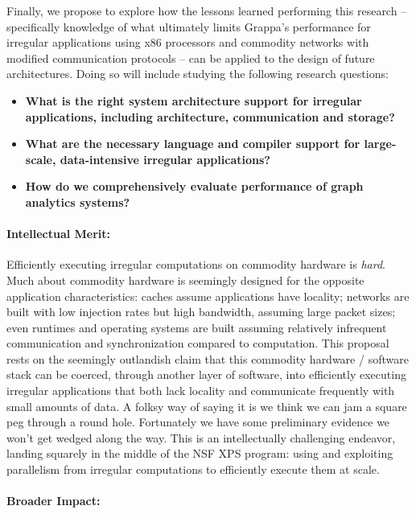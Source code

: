 Finally, we propose to explore how the lessons learned performing this research -- specifically knowledge of what ultimately limits Grappa's performance for irregular applications using x86 processors and commodity networks with modified communication protocols -- can be applied to the design of future architectures.  Doing so will include studying the following research questions:

\begin{itemize}
\item \textbf{What is the right system architecture support for irregular applications, including architecture, communication and storage?}
\item \textbf{What are the necessary language and compiler support for large-scale, data-intensive irregular applications?}
\item \textbf{How do we comprehensively evaluate performance of graph analytics systems?}
\end{itemize}

\paragraph{Intellectual Merit:}

Efficiently executing irregular computations on commodity hardware is \emph{hard}.  Much about commodity hardware is seemingly designed for the opposite application characteristics: caches assume applications have locality; networks are built with low injection rates but high bandwidth, assuming large packet sizes; even runtimes and operating systems are built assuming relatively infrequent communication and synchronization compared to computation.  This proposal rests on the seemingly outlandish claim that this commodity hardware / software stack can be coerced, through another layer of software, into efficiently executing irregular applications that both lack locality and communicate frequently with small amounts of data.  A folksy way of saying it is we think we can jam a square peg through a round hole.  Fortunately we have some preliminary evidence we won't get wedged along the way.  This is an intellectually challenging endeavor, landing squarely in the middle of the NSF XPS program: using and exploiting parallelism from irregular computations to efficiently execute them at scale.

\paragraph{Broader Impact:}

